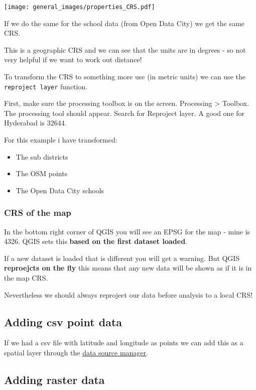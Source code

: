 \documentclass[
  letterpaper,
]{scrbook}
\providecommand{\tightlist}{%
  \setlength{\itemsep}{0pt}\setlength{\parskip}{0pt}}\usepackage{longtable,booktabs,array}
\begin{document}
\texttt{[image: general\_images/properties\_CRS.pdf]}

If we do the same for the school data (from Open Data City) we get the
same CRS.

This is a geographic CRS and we can see that the units are in degrees -
so not very helpful if we want to work out distance!

To transform the CRS to something more use (in metric units) we can use
the \texttt{reproject\ layer} function.

First, make sure the processing toolbox is on the screen. Processing
\textgreater{} Toolbox. The processing tool should appear. Search for
Reproject layer. A good one for Hyderabad is 32644.

For this example i have transformed:

\begin{itemize}
\tightlist
\item
  The sub districts
\item
  The OSM points
\item
  The Open Data City schools
\end{itemize}

\hypertarget{crs-of-the-map}{%
\subsubsection{CRS of the map}\label{crs-of-the-map}}

In the bottom right corner of QGIS you will see an EPSG for the map -
mine is 4326. QGIS sets this \textbf{based on the first dataset loaded}.

If a new dataset is loaded that is different you will get a warning. But
QGIS \textbf{reproejcts on the fly} this means that any new data will be
shown as if it is in the map CRS.

Nevertheless we should always reproject our data before analysis to a
local CRS!

\hypertarget{adding-csv-point-data}{%
\subsection{Adding csv point data}\label{adding-csv-point-data}}

If we had a csv file with latitude and longitude as points we can add
this as a spatial layer through the
\href{https://andrewmaclachlan.github.io/CASA0005repo/geographic-information.html\#load-data}{data
source manager}.

\hypertarget{adding-raster-data}{%
\subsection{Adding raster data}\label{adding-raster-data}}
\end{document}
